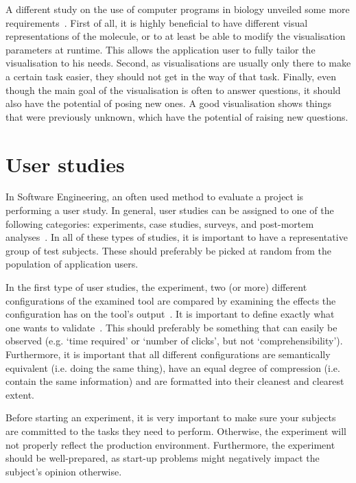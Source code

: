 A different study on the use of computer programs in biology unveiled some more requirements~\cite{taylor2013interface}. First of all, it is highly beneficial to have different visual representations of the molecule, or to at least be able to modify the visualisation parameters at runtime. This allows the application user to fully tailor the visualisation to his needs. Second, as visualisations are usually only there to make a certain task easier, they should not get in the way of that task. Finally, even though the main goal of the visualisation is often to answer questions, it should also have the potential of posing new ones. A good visualisation shows things that were previously unknown, which have the potential of raising new questions.


\section{User studies}
In Software Engineering, an often used method to evaluate a project is performing a user study. In general, user studies can be assigned to one of the following categories: experiments, case studies, surveys, and post-mortem analyses~\cite{wohlin2003empirical}. In all of these types of studies, it is important to have a representative group of test subjects. These should preferably be picked at random from the population of application users.

In the first type of user studies, the experiment, two (or more) different configurations of the examined tool are compared by examining the effects the configuration has on the tool's output~\cite{wohlin2003empirical}. It is important to define exactly what one wants to validate~\cite{stein2009assessing}. This should preferably be something that can easily be observed (e.g. `time required' or `number of clicks', but not `comprehensibility'). Furthermore, it is important that all different configurations are semantically equivalent (i.e. doing the same thing), have an equal degree of compression (i.e. contain the same information) and are formatted into their cleanest and clearest extent.

Before starting an experiment, it is very important to make sure your subjects are committed to the tasks they need to perform. Otherwise, the experiment will not properly reflect the production environment. Furthermore, the experiment should be well-prepared, as start-up problems might negatively impact the subject's opinion otherwise.

